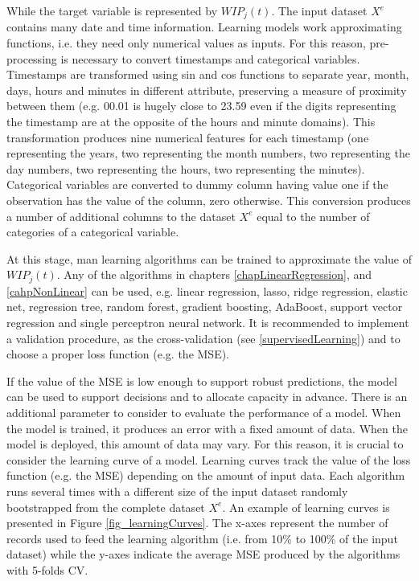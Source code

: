 While the target variable is represented by $WIP_j(t)$. The input dataset $X^e$ contains many date and time information. Learning models work approximating functions, i.e. they need only numerical values as inputs. For this reason, pre-processing is necessary to convert timestamps and categorical variables. Timestamps are transformed using sin and cos functions to separate year, month, days, hours and minutes in different attribute, preserving a measure of proximity between them (e.g. 00.01 is hugely close to 23.59 even if the digits representing the timestamp are at the opposite of the hours and minute domains). This transformation produces nine numerical features for each timestamp (one representing the years, two representing the month numbers, two representing the day numbers, two representing the hours, two representing the minutes). Categorical variables are converted to dummy column having value one if the observation has the value of the column, zero otherwise. This conversion produces a number of additional columns to the dataset $X^e$ equal to the number of categories of a categorical variable.\par

At this stage, man learning algorithms can be trained to approximate the value of $WIP_j(t)$. Any of the algorithms in chapters \ref{chapLinearRegression}, and \ref{cahpNonLinear} can be used, e.g. linear regression, lasso, ridge regression, elastic net, regression tree, random forest, gradient boosting, AdaBoost, support vector regression and single perceptron neural network. It is recommended to implement a validation procedure, as the cross-validation (see \ref{supervisedLearning}) and to choose a proper loss function (e.g. the MSE).\par

If the value of the MSE is low enough to support robust predictions, the model can be used to support decisions and to allocate capacity in advance. There is an additional parameter to consider to evaluate the performance of a model. When the model is trained, it produces an error with a fixed amount of data. When the model is deployed, this amount of data may vary. For this reason, it is crucial to consider the learning curve of a model. Learning curves track the value of the loss function (e.g. the MSE) depending on the amount of input data. Each algorithm runs several times with a different size of the input dataset randomly bootstrapped from the complete dataset $X^e$. An example of learning curves is presented in Figure \ref{fig_learningCurves}. The x-axes represent the number of records used to feed the learning algorithm (i.e. from 10\% to 100\% of the input dataset) while the y-axes indicate the average MSE produced by the algorithms with 5-folds CV.

